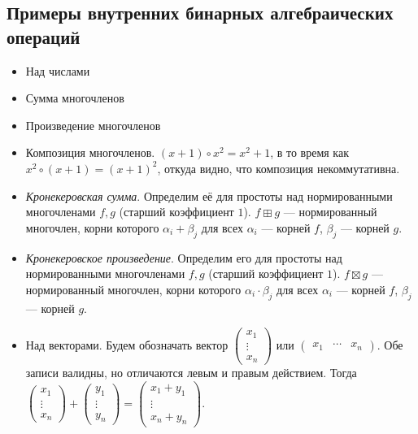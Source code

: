 \documentclass[a4paper]{report}
\begin{document}
    \subsection{Примеры внутренних бинарных алгебраических операций}
    \label{binary_operations}
    \begin{itemize}
        \item Над числами
        \item Сумма многочленов
        \item Произведение многочленов
        \item Композиция многочленов.
        $(x + 1) \circ x^2 = x^2 + 1$, в то время как $x^2 \circ (x + 1) = (x + 1)^2$, откуда видно, что композиция некоммутативна.
        \item \textit{Кронекеровская сумма}.
        Определим её для простоты над нормированными многочленами $f, g$ (старший коэффициент $1$).
        $f \boxplus  g$ --- нормированный многочлен, корни которого $\alpha_i + \beta_j$ для всех $\alpha_i$ --- корней $f$, $\beta_j$ --- корней $g$.

        \item \textit{Кронекеровское произведение}.
        Определим его для простоты над нормированными многочленами $f, g$ (старший коэффициент $1$).
        $f \boxtimes  g$ --- нормированный многочлен, корни которого $\alpha_i \cdot \beta_j$ для всех $\alpha_i$ --- корней $f$, $\beta_j$ --- корней $g$.

        \item Над векторами.
        Будем обозначать вектор $\begin{pmatrix}
                                     x_1\\ \vdots \\ x_n
        \end{pmatrix}$ или $\begin{pmatrix}
                                x_1& \cdots & x_n
        \end{pmatrix}$.
        Обе записи валидны, но отличаются левым и правым действием.
        Тогда $\begin{pmatrix}
                   x_1\\ \vdots \\ x_n
        \end{pmatrix} + \begin{pmatrix}
                            y_1\\ \vdots \\ y_n
        \end{pmatrix} = \begin{pmatrix}
                            x_1 + y_1\\ \vdots \\ x_n + y_n
        \end{pmatrix}$.


\end{itemize}
\end{document}
